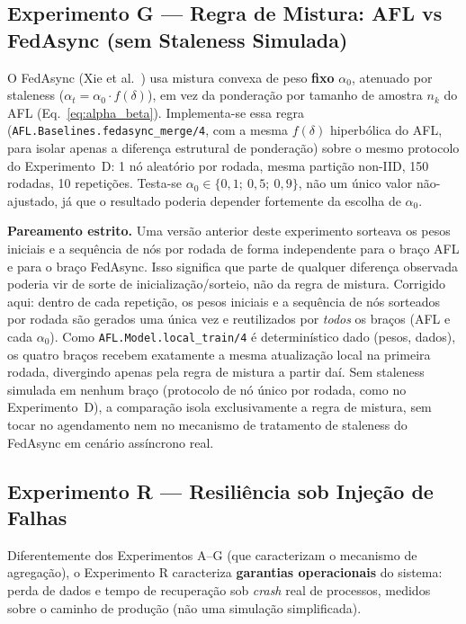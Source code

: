 \documentclass[conference,a4paper]{IEEEtran}
\begin{document}
\subsection{Experimento G --- Regra de Mistura: AFL vs FedAsync (sem Staleness Simulada)}
\label{sec:exp_g}

O FedAsync (Xie et al.~\cite{xie2019}) usa mistura convexa de peso
\textbf{fixo} $\alpha_0$, atenuado por staleness
($\alpha_t = \alpha_0 \cdot f(\delta)$), em vez da ponderação por tamanho
de amostra $n_k$ do AFL (Eq.~\ref{eq:alpha_beta}). Implementa-se essa regra
(\texttt{AFL.Baselines.fedasync\_merge/4}, com a mesma $f(\delta)$
hiperbólica do AFL, para isolar apenas a diferença estrutural de
ponderação) sobre o mesmo protocolo do Experimento~D: 1 nó aleatório por
rodada, mesma partição non-IID, 150 rodadas, 10 repetições. Testa-se
$\alpha_0 \in \{0{,}1;\ 0{,}5;\ 0{,}9\}$, não um único valor não-ajustado,
já que o resultado poderia depender fortemente da escolha de $\alpha_0$.

\textbf{Pareamento estrito.} Uma versão anterior deste experimento sorteava
os pesos iniciais e a sequência de nós por rodada de forma independente
para o braço AFL e para o braço FedAsync. Isso significa que parte de
qualquer diferença observada poderia vir de sorte de inicialização/sorteio,
não da regra de mistura. Corrigido aqui: dentro de cada repetição, os pesos
iniciais e a sequência de nós sorteados por rodada são gerados uma única
vez e reutilizados por \emph{todos} os braços (AFL e cada $\alpha_0$). Como
\texttt{AFL.Model.local\_train/4} é determinístico dado
(pesos, dados), os quatro braços recebem exatamente a mesma atualização
local na primeira rodada, divergindo apenas pela regra de mistura a partir
daí. Sem staleness simulada em nenhum braço (protocolo de nó único por
rodada, como no Experimento~D), a comparação isola exclusivamente a regra
de mistura, sem tocar no agendamento nem no mecanismo de tratamento de
staleness do FedAsync em cenário assíncrono real.

\subsection{Experimento R --- Resiliência sob Injeção de Falhas}
\label{sec:exp_h}

Diferentemente dos Experimentos A--G (que caracterizam o mecanismo de
agregação), o Experimento R caracteriza \textbf{garantias operacionais} do
sistema: perda de dados e tempo de recuperação sob \textit{crash} real de
processos, medidos sobre o caminho de produção (não uma simulação
simplificada).
\end{document}
